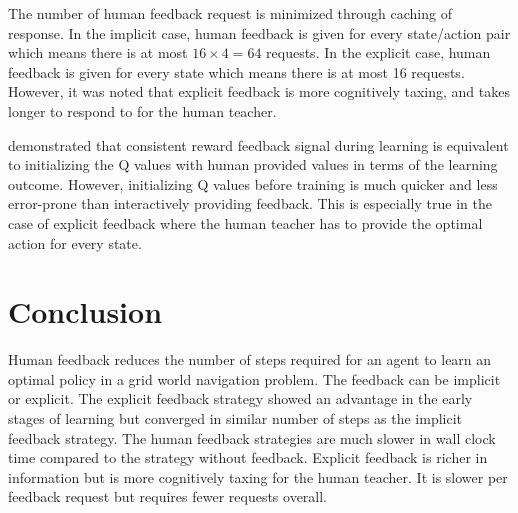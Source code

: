 \documentclass[conference]{IEEEtran}
\begin{document}
The number of human feedback request is minimized through caching of response. In the implicit case, human feedback is given for every state/action pair which means there is at most \(16 \times 4 = 64\) requests. In the explicit case, human feedback is given for every state which means there is at most 16 requests. However, it was noted that explicit feedback is more cognitively taxing, and takes longer to respond to for the human teacher.

\cite{wiewioraPotentialBasedShapingQValue2003} demonstrated that consistent reward feedback signal during learning is equivalent to initializing the Q values with human provided values in terms of the learning outcome. However, initializing Q values before training is much quicker and less error-prone than interactively providing feedback. This is especially true in the case of explicit feedback where the human teacher has to provide the optimal action for every state.

\section{Conclusion}

Human feedback reduces the number of steps required for an agent to learn an optimal policy in a grid world navigation problem. The feedback can be implicit or explicit. The explicit feedback strategy showed an advantage in the early stages of learning but converged in similar number of steps as the implicit feedback strategy. The human feedback strategies are much slower in wall clock time compared to the strategy without feedback. Explicit feedback is richer in information but is more cognitively taxing for the human teacher. It is slower per feedback request but requires fewer requests overall.



\end{document}
